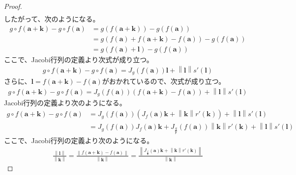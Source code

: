 \documentclass[dvipdfmx]{jsarticle}
\begin{document}
\begin{proof}
\begin{align*}
\end{align*}
したがって、次のようになる。
\begin{align*}
g \circ f\left( \mathbf{a} + \mathbf{k} \right) - g \circ f\left( \mathbf{a} \right) &= g\left( f\left( \mathbf{a} + \mathbf{k} \right) \right) - g\left( f\left( \mathbf{a} \right) \right)\\
&= g\left( f\left( \mathbf{a} \right) + f\left( \mathbf{a} + \mathbf{k} \right) - f\left( \mathbf{a} \right) \right) - g\left( f\left( \mathbf{a} \right) \right)\\
&= g\left( f\left( \mathbf{a} \right) + \mathbf{l} \right) - g\left( f\left( \mathbf{a} \right) \right)
\end{align*}
ここで、Jacobi行列の定義より次式が成り立つ。
\begin{align*}
g \circ f\left( \mathbf{a} + \mathbf{k} \right) - g \circ f\left( \mathbf{a} \right) = J_{g}\left( f\left( \mathbf{a} \right) \right)\mathbf{l} + \left\| \mathbf{l} \right\| s'\left( \mathbf{l} \right)
\end{align*}
さらに、$\mathbf{l} = f\left( \mathbf{a} + \mathbf{k} \right) - f\left( \mathbf{a} \right)$がおかれているので、次式が成り立つ。
\begin{align*}
g \circ f\left( \mathbf{a} + \mathbf{k} \right) - g \circ f\left( \mathbf{a} \right) = J_{g}\left( f\left( \mathbf{a} \right) \right)\left( f\left( \mathbf{a} + \mathbf{k} \right) - f\left( \mathbf{a} \right) \right) + \left\| \mathbf{l} \right\| s'\left( \mathbf{l} \right)
\end{align*}
Jacobi行列の定義より次のようになる。
\begin{align*}
g \circ f\left( \mathbf{a} + \mathbf{k} \right) - g \circ f\left( \mathbf{a} \right) &= J_{g}\left( f\left( \mathbf{a} \right) \right)\left( J_{f}\left( \mathbf{a} \right)\mathbf{k} + \left\| \mathbf{k} \right\| r'\left( \mathbf{k} \right) \right) + \left\| \mathbf{l} \right\| s'\left( \mathbf{l} \right)\\
&= J_{g}\left( f\left( \mathbf{a} \right) \right)J_{f}\left( \mathbf{a} \right)\mathbf{k} + J_{\frac{g}{\mathbf{y}}}\left( f\left( \mathbf{a} \right) \right)\left\| \mathbf{k} \right\| r'\left( \mathbf{k} \right) + \left\| \mathbf{l} \right\| s'\left( \mathbf{l} \right)
\end{align*}
ここで、Jacobi行列の定義より次のようになる。
\begin{align*}
\frac{\left\| \mathbf{l} \right\|}{\left\| \mathbf{k} \right\|} = \frac{\left\| f\left( \mathbf{a} + \mathbf{k} \right) - f\left( \mathbf{a} \right) \right\|}{\left\| \mathbf{k} \right\|} = \frac{\left\| J_{\frac{f}{\mathbf{x}}}\left( \mathbf{a} \right)\mathbf{k} + \left\| \mathbf{k} \right\| r'\left( \mathbf{k} \right) \right\|}{\left\| \mathbf{k} \right\|}

\end{align*}
\end{proof}
\end{document}

